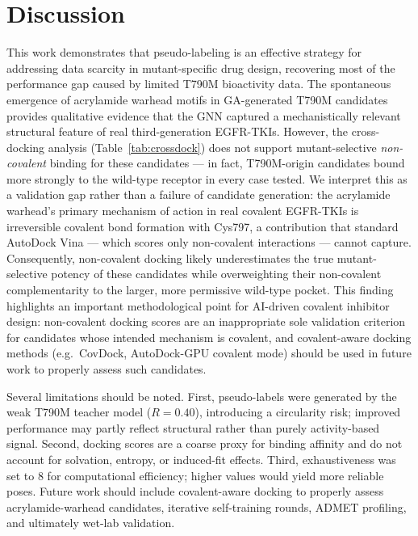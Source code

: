 \documentclass[11pt]{article}
\begin{document}
\section{Discussion}

This work demonstrates that pseudo-labeling is an effective strategy for
addressing data scarcity in mutant-specific drug design, recovering most of
the performance gap caused by limited T790M bioactivity data.
The spontaneous emergence of acrylamide warhead motifs in GA-generated T790M
candidates provides qualitative evidence that the GNN captured a
mechanistically relevant structural feature of real third-generation
EGFR-TKIs. However, the cross-docking analysis (Table~\ref{tab:crossdock})
does not support mutant-selective \emph{non-covalent} binding for these
candidates --- in fact, T790M-origin candidates bound more strongly to the
wild-type receptor in every case tested. We interpret this as a validation
gap rather than a failure of candidate generation: the acrylamide warhead's
primary mechanism of action in real covalent EGFR-TKIs is irreversible
covalent bond formation with Cys797, a contribution that standard AutoDock
Vina --- which scores only non-covalent interactions --- cannot capture.
Consequently, non-covalent docking likely underestimates the true
mutant-selective potency of these candidates while overweighting their
non-covalent complementarity to the larger, more permissive wild-type pocket.
This finding highlights an important methodological point for AI-driven
covalent inhibitor design: non-covalent docking scores are an inappropriate
sole validation criterion for candidates whose intended mechanism is covalent,
and covalent-aware docking methods (e.g.\ CovDock, AutoDock-GPU covalent mode)
should be used in future work to properly assess such candidates.

Several limitations should be noted.
First, pseudo-labels were generated by the weak T790M teacher model ($R = 0.40$),
introducing a circularity risk; improved performance may partly reflect
structural rather than purely activity-based signal.
Second, docking scores are a coarse proxy for binding affinity and do not
account for solvation, entropy, or induced-fit effects.
Third, exhaustiveness was set to 8 for computational efficiency; higher values
would yield more reliable poses.
Future work should include covalent-aware docking to properly assess
acrylamide-warhead candidates, iterative self-training rounds, ADMET
profiling, and ultimately wet-lab validation.
\end{document}
